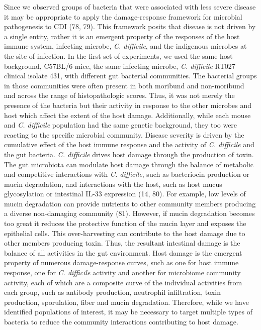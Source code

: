 \documentclass[
  12pt,
]{article}
\begin{document}
Since we observed groups of bacteria that were associated with less
severe disease it may be appropriate to apply the damage-response
framework for microbial pathogenesis to CDI (78, 79). This framework
posits that disease is not driven by a single entity, rather it is an
emergent property of the responses of the host immune system, infecting
microbe, \emph{C. difficile}, and the indigenous microbes at the site of
infection. In the first set of experiments, we used the same host
background, C57BL/6 mice, the same infecting microbe, \emph{C.
difficile} RT027 clinical isolate 431, with different gut bacterial
communities. The bacterial groups in those communities were often
present in both moribund and non-moribund and across the range of
histopathologic scores. Thus, it was not merely the presence of the
bacteria but their activity in response to the other microbes and host
which affect the extent of the host damage. Additionally, while each
mouse and \emph{C. difficile} population had the same genetic
background, they too were reacting to the specific microbial community.
Disease severity is driven by the cumulative effect of the host immune
response and the activity of \emph{C. difficile} and the gut bacteria.
\emph{C. difficile} drives host damage through the production of toxin.
The gut microbiota can modulate host damage through the balance of
metabolic and competitive interactions with \emph{C. difficile}, such as
bacteriocin production or mucin degradation, and interactions with the
host, such as host mucus glycosylation or intestinal IL-33 expression
(14, 80). For example, low levels of mucin degradation can provide
nutrients to other community members producing a diverse non-damaging
community (81). However, if mucin degradation becomes too great it
reduces the protective function of the mucin layer and exposes the
epithelial cells. This over-harvesting can contribute to the host damage
due to other members producing toxin. Thus, the resultant intestinal
damage is the balance of all activities in the gut environment. Host
damage is the emergent property of numerous damage-response curves, such
as one for host immune response, one for \emph{C. difficile} activity
and another for microbiome community activity, each of which are a
composite curve of the individual activities from each group, such as
antibody production, neutrophil infiltration, toxin production,
sporulation, fiber and mucin degradation. Therefore, while we have
identified populations of interest, it may be necessary to target
multiple types of bacteria to reduce the community interactions
contributing to host damage.
\end{document}
